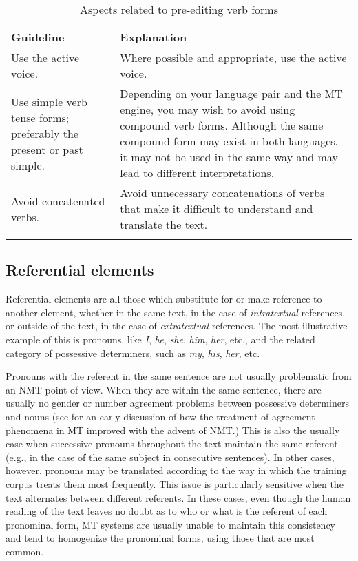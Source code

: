 \documentclass[output=paper,colorlinks,citecolor=brown,
]{langscibook}
\begin{document}
\begin{table}
\begin{tabularx}{\textwidth}{QQ}
\lsptoprule
{Guideline} & {Explanation}\\
\midrule
Use the active voice. & Where possible and appropriate, use the active voice. \\
\tablevspace

\raggedright
Use simple verb tense forms; preferably the present or past simple. & Depending on your language pair and the MT engine, you may wish to avoid using compound verb forms. Although the same compound form may exist in both languages, it may not be used in the same way and may lead to different interpretations.\\
\tablevspace

Avoid concatenated verbs. & Avoid unnecessary concatenations of verbs that make it difficult to understand and translate the text.\\
\lspbottomrule
\end{tabularx}
\caption{Aspects related to pre-editing verb forms}
\label{tab:sanchez:3}
\end{table}

\subsection{Referential elements}\label{sec:sanchez:6.4}

Referential elements are all those which substitute for or make reference to another element, whether in the same text, in the case of \textit{intratextual} references, or outside of the text, in the case of \textit{extratextual} references. The most illustrative example of this is pronouns, like \textit{I}, \textit{he}, \textit{she}, \textit{him}, \textit{her}, etc., and the related category of possessive determiners, such as \textit{my}, \textit{his}, \textit{her}, etc. 

Pronouns with the referent in the same sentence are not usually problematic from an NMT point of view. When they are within the same sentence, there are usually no gender or number agreement problems between possessive determiners and nouns (see \citet{Bentivogli2016} for an early discussion of how the treatment of agreement phenomena in MT improved with the advent of NMT.) This is also the usually case when successive pronouns throughout the text maintain the same referent (e.g., in the case of the same subject in consecutive sentences). In other cases, however, pronouns may be translated according to the way in which the training corpus treats them most frequently. This issue is particularly sensitive when the text alternates between different referents. In these cases, even though the human reading of the text leaves no doubt as to who or what is the referent of each pronominal form, MT systems are usually unable to maintain this consistency and tend to homogenize the pronominal forms, using those that are most common. 
\end{document}
